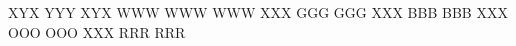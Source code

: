 \RubikFaceUp XYX YYY XYX
\RubikFaceDown WWW WWW WWW
\RubikFaceLeft XXX GGG GGG
\RubikFaceRight XXX BBB BBB
\RubikFaceFront XXX OOO OOO
\RubikFaceBack XXX RRR RRR